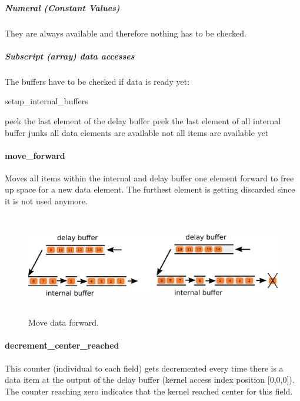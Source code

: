 \subparagraph{Numeral (Constant Values)}
They are always available and therefore nothing has to be checked.

\subparagraph{Subscript (array) data accesses}
The buffers have to be checked if data is ready yet:
\begin{algorithm}
	\caption{setup\_internal\_buffers}
	\begin{algorithmic}
		\STATE peek the last element of the delay buffer
		\STATE peek the last element of all internal buffer junks
		\STATE all data elements are available
		\ELSE
		\STATE not all items are available yet
		\ENDIF
	\end{algorithmic}
\end{algorithm}


\paragraph{move\_forward}
Moves all items within the internal and delay buffer one element forward to free up space for a new data element. The furthest element is getting discarded since it is not used anymore.  
\begin{figure}[h]
	\centering
	\includegraphics[height=12em]{drawings/implementation-move-forward.png}
	\caption{Move data forward.}
	\label{fig:implementation-move-forward}
\end{figure}


\paragraph{decrement\_center\_reached}
This counter (individual to each field) gets decremented every time there is a data item at the output of the delay buffer (kernel access index position [0,0,0]). The counter reaching zero indicates that the kernel reached center for this field.


